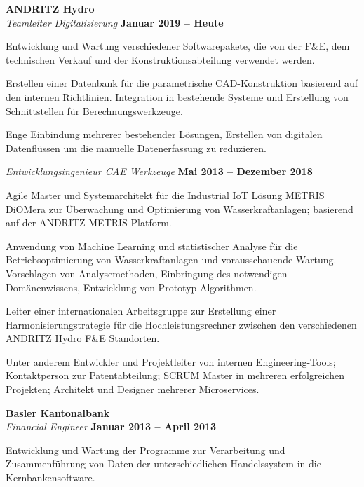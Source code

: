 \documentclass[line,11pt,a4paper]{../resume}
\begin{document}
\begin{resume}
\textbf{ANDRITZ Hydro}\\\vspace{1mm}%
\textsl{Teamleiter Digitalisierung} \hfill \textbf{Januar 2019 -- Heute}\\
\vspace{-4mm}%
\begin{list2}
  \item Entwicklung und Wartung verschiedener Softwarepakete, die von der F\&E,
    dem technischen Verkauf und der Konstruktionsabteilung verwendet werden.
  \item Erstellen einer Datenbank für die parametrische CAD-Konstruktion
    basierend auf den internen Richtlinien. Integration in bestehende Systeme
    und Erstellung von Schnittstellen für Berechnungswerkzeuge.
  \item Enge Einbindung mehrerer bestehender Lösungen, Erstellen von digitalen
    Datenflüssen um die manuelle Datenerfassung zu reduzieren.
\end{list2}

\textsl{Entwicklungsingenieur CAE Werkzeuge} \hfill \textbf{Mai 2013 -- Dezember 2018}\\
\vspace{-4mm}%
\begin{list2}
  \item Agile Master und Systemarchitekt für die Industrial IoT Lösung METRIS
    DiOMera zur Überwachung und Optimierung von Wasserkraftanlagen; basierend
    auf der ANDRITZ METRIS Platform.

  \item Anwendung von Machine Learning und statistischer Analyse für die
    Betriebsoptimierung von Wasserkraftanlagen und vorausschauende Wartung.
    Vorschlagen von Analysemethoden, Einbringung des notwendigen
    Domänenwissens, Entwicklung von Prototyp-Algorithmen.

  \item Leiter einer internationalen Arbeitsgruppe zur Erstellung
    einer Harmonisierungstrategie für die Hochleistungsrechner zwischen den
    verschiedenen ANDRITZ Hydro F\&E Standorten.

  \item Unter anderem Entwickler und Projektleiter von internen
    Engineering-Tools; Kontaktperson zur Patentabteilung; SCRUM Master in
    mehreren erfolgreichen Projekten; Architekt und Designer mehrerer
    Microservices.
\end{list2}

\textbf{Basler Kantonalbank}\\\vspace{1mm}%
\textsl{Financial Engineer} \hfill \textbf{Januar 2013 -- April 2013}\\
\vspace{-4mm}%
\begin{list2}
  \item Entwicklung und Wartung der Programme zur Verarbeitung und
    Zusammenführung von Daten der unterschiedlichen Handelssystem in die
    Kernbankensoftware.
\end{list2}


\end{resume}
\end{document}

